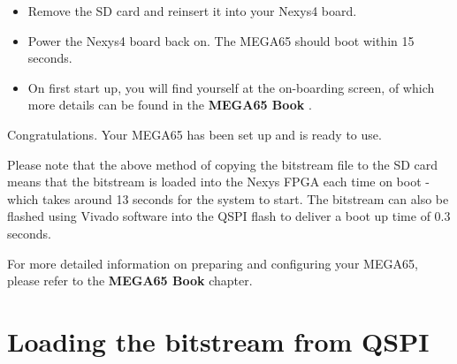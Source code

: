 \begin{itemize}
  \begin{itemize}
    \item The bitstream file
    \item The extracted files from within either the "\textbf{SD essentials.rar}"
	      or "\textbf{SD essentialsNoROM.rar}" file that you downloaded from
		  the MEGA65 filehost.
    \item{If you have sourced your own preferred ROM file} (e.g. "\textbf{911001.BIN}"), copy it onto the SD card also, and rename it to "\textbf{MEGA65.ROM}" (uppercase is essential).
    \item{Any .D81 disk image files} you wish to make use of.
      \begin{itemize}
        \item Note that if a file named MEGA65.D81 is added to the SD card, it will be mounted automatically on startup.
        \item Make sure that all .D81 files have names that fit the old DOS 8.3 character limit, and are upper case.  This restriction will be removed in a future release.
      \end{itemize}
  \end{itemize}
\item{Remove the SD card} and reinsert it into your Nexys4 board.
\item{Power the Nexys4} board back on.  The MEGA65 should boot within 15 seconds.
\item On first start up, you will find yourself at the on-boarding screen, of which more
    details can be found in
\ifdefined\printmanual
the {\bf MEGA65 Book}
\else
{}
\fi
.

\end{itemize}

Congratulations. Your MEGA65 has been set up and is ready to use.

Please note that the above method of copying the bitstream file to the SD card means that the bitstream is loaded into the Nexys FPGA each time on boot - which takes around 13 seconds for the system to start. The bitstream can also be flashed using Vivado software into the QSPI flash to deliver a boot up time of 0.3 seconds.

For more detailed information on preparing and configuring your MEGA65, please refer
to
\ifdefined\printmanual
the {\bf MEGA65 Book}
\else
{}
\fi
chapter.

\section{Loading the bitstream from QSPI}

